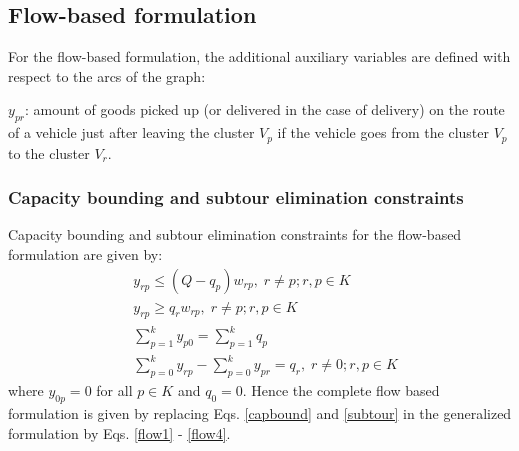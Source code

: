 \documentclass[letterpaper,12pt,onehalfspacing,twoside]{article}
\theoremstyle{msds}
\begin{document}
\subsection{Flow-based formulation}
For the flow-based formulation, the additional auxiliary variables are defined with respect to the arcs of the graph:

$y_{pr}$: amount of goods picked up (or delivered in the case of delivery) on the route of a vehicle just after leaving the cluster $V_p$ if the vehicle goes from the cluster $V_p$ to the cluster $V_r$.
\subsubsection{Capacity bounding and subtour elimination constraints}
Capacity bounding and subtour elimination constraints for the flow-based formulation are given by:
\begin{align}
&y_{rp} \le (Q - q_p) w_{rp}, \; r \ne p; r,p \in K \label{flow1} \\
&y_{rp} \ge q_r w_{rp}, \;  r \ne p; r, p \in K \label{flow2}\\
&\sum_{p=1}^k y_{p0} =  \sum_{p=1}^k q_p \label{flow3} \\
&\sum_{p=0}^k y_{rp} - \sum_{p=0}^k y_{pr} = q_r, \; r \ne 0; r,p \in K \label{flow4}
\end{align}
where $y_{0p} = 0$ for all $p \in K$ and $q_0 = 0$.
Hence the complete flow based formulation is given by replacing Eqs. \eqref{capbound} and \eqref{subtour} in the generalized formulation by  Eqs. \eqref{flow1} - \eqref{flow4}.
\end{document}
